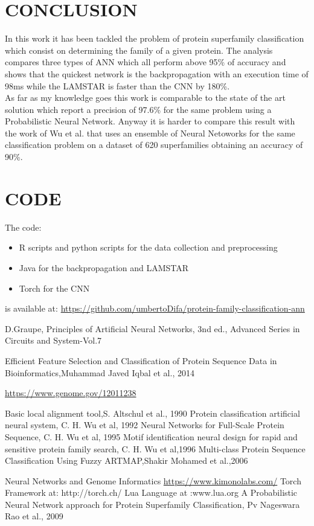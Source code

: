 \documentclass[a4paper, 10pt, conference]{ieeeconf}      %
\begin{document}
\section{CONCLUSION}\label{sec:conclusion}
In this work it has been tackled the problem of protein superfamily classification which consist on determining the family of a given protein. The analysis compares three types of ANN which all perform above 95\% of accuracy and shows that the quickest network is the backpropagation with an execution time of 98ms while the LAMSTAR is faster than the CNN by 180\%.\\
As far as my knowledge goes this work is comparable to the state of the art solution\cite{probab} which report a precision of 97.6\% for the same problem using a Probabilistic Neural Network. Anyway it is harder to compare this result with the work of Wu et al.\cite{wu1992} that uses an ensemble of Neural Netoworks for the same classification problem on a dataset of 620 superfamilies obtaining an accuracy of 90\%.
\section{CODE}
The code:
\begin{itemize}
	\item  R scripts and python scripts for the data collection and preprocessing
	\item Java for the backpropagation and LAMSTAR
	\item Torch for the CNN
\end{itemize}
is available at: \href{https://github.com/umbertoDifa/protein-family-classification-ann}{https://github.com/umbertoDifa/protein-family-classification-ann}


\clearpage
\newpage
\begin{thebibliography}{99}

D.Graupe, Principles of Artificial Neural Networks, 3nd ed., Advanced Series in Circuits and System-Vol.7

Efficient Feature Selection and Classification of Protein Sequence Data in Bioinformatics,Muhammad Javed Iqbal et al., 2014

\href{https://www.genome.gov/12011238}{https://www.genome.gov/12011238}

Basic local alignment tool,S. Altschul et al., 1990
Protein classification artificial neural system, C. H. Wu et al, 1992
Neural Networks for Full-Scale Protein Sequence, C. H. Wu et al, 1995
Motif identification neural design for rapid and sensitive protein family search, C. H. Wu et al,1996
Multi-class Protein Sequence Classification Using Fuzzy ARTMAP,Shakir Mohamed et al.,2006

Neural Networks and Genome Informatics
\href{https://www.kimonolabs.com/}{https://www.kimonolabs.com/}
Torch Framework at: http://torch.ch/
Lua Language at :www.lua.org
A Probabilistic Neural Network approach for
Protein Superfamily Classification, Pv Nageswara Rao et al., 2009

\end{thebibliography}
\end{document}

